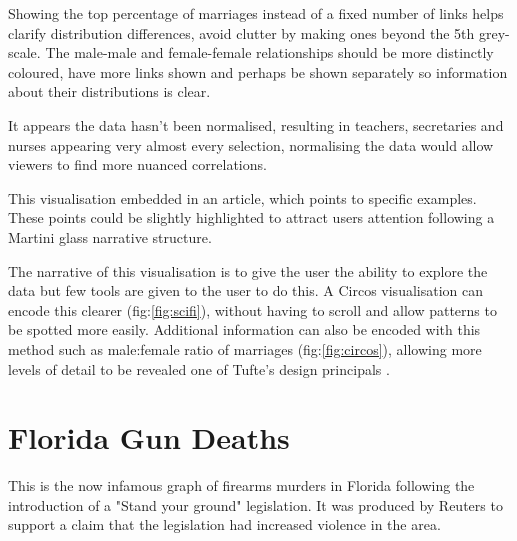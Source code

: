 \documentclass[a4paper,10pt, twocolumn]{article}
\begin{document}
Showing the top percentage of marriages instead of a fixed number of links helps clarify distribution differences, avoid clutter by making ones beyond the 5th grey-scale. The male-male and female-female relationships should be more distinctly coloured, have more links shown and perhaps be shown separately so information about their distributions is clear.  

It appears the data hasn't been normalised, resulting in teachers, secretaries and nurses appearing very almost every selection, normalising the data would allow viewers to find more nuanced correlations. 

This visualisation embedded in an article, which points to specific examples. These points could be slightly highlighted to attract users attention following a Martini glass narrative structure\cite{narrative}.  

The narrative of this visualisation is to give the user the ability to explore the data but few tools are given to the user to do this. A Circos visualisation can encode this clearer (fig:\ref{fig:scifi}), without having to scroll and allow patterns to be spotted more easily\cite{circoscite}. Additional information can also be encoded with this method such as male:female ratio of marriages (fig:\ref{fig:circos}), allowing more levels of detail to be revealed one of Tufte's design principals \cite{tufte}.  



\section{Florida Gun Deaths\cite{floridagun}}
This is the now infamous graph of firearms murders in Florida following the introduction of a "Stand your ground" legislation. It was produced by Reuters to support a claim that the legislation had increased violence in the area. 
\end{document}
